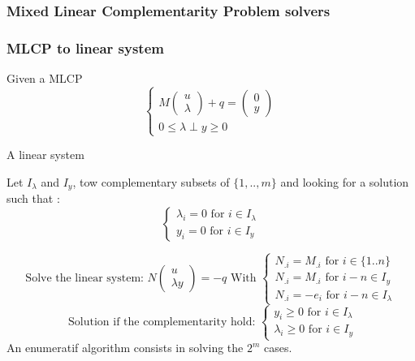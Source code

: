 \frame
{
  \frametitle{Mixed Linear Complementarity Problem solvers}

}

\frame
{
\frametitle{MLCP to linear system}
\begin{block}{ Given a MLCP}
 \begin{equation}\label{eq:mlcp1}
 \begin{cases}
M \left(\begin{array}{c}
   u\\
   \lambda
   \end{array}\right) + q = \left(\begin{array}{c}
   0\\
   y
   \end{array}\right) \\
      0 \le \lambda \perp     y   \ge 0

      \end{cases}
\end{equation}


\end{block}

\begin{block}{A linear system}

Let $I_\lambda$ and $I_y$, tow complementary subsets of $\{1,..,m\}$ and
looking for a solution such that : \\
\[
\begin{cases}
\lambda_i=0 \textrm{ for } i \in I_\lambda \\
 y_i=0 \textrm{ for } i \in I_y
\end{cases}
 \]




\[\textrm{Solve the linear system: }N \left(\begin{array}{c}
   u\\
   \lambda y
   \end{array}\right) = -q   \textrm{   With   }
   \begin{cases}
   N_{.i}=M_{.i} \textrm{ for } i \in \{1..n\}\\
   N_{.i}=M_{.i} \textrm{ for } i-n \in I_y\\
   N_{.i}=-e_{i} \textrm{ for } i-n \in I_\lambda
\end{cases}
\]
\[ \textrm { Solution if the complementarity hold: }
\begin{cases}
y_i \ge 0 \textrm{ for } i \in I_\lambda  \\
\lambda_i \ge 0 \textrm{ for } i \in I_y
\end{cases}
\]
An enumeratif algorithm consists in solving the $2^m$ cases.

\end{block}

}
